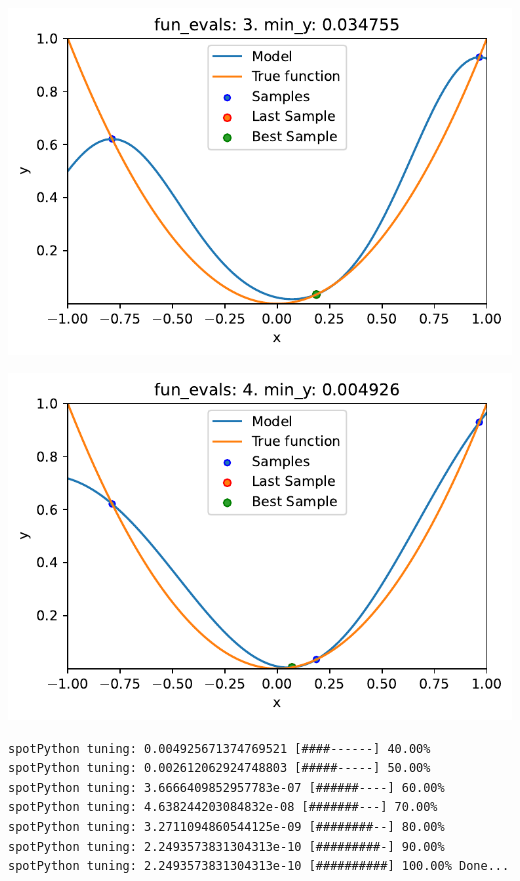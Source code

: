 \documentclass[
  letterpaper,
  DIV=11,
  numbers=noendperiod]{scrreprt}
\begin{document}
\includegraphics{010_num_spot_sklearn_surrogate_files/figure-pdf/cell-24-output-1.pdf}

\includegraphics{010_num_spot_sklearn_surrogate_files/figure-pdf/cell-24-output-2.pdf}

\begin{verbatim}
spotPython tuning: 0.004925671374769521 [####------] 40.00% 
spotPython tuning: 0.002612062924748803 [#####-----] 50.00% 
spotPython tuning: 3.6666409852957783e-07 [######----] 60.00% 
spotPython tuning: 4.638244203084832e-08 [#######---] 70.00% 
spotPython tuning: 3.2711094860544125e-09 [########--] 80.00% 
spotPython tuning: 2.2493573831304313e-10 [#########-] 90.00% 
spotPython tuning: 2.2493573831304313e-10 [##########] 100.00% Done...
\end{verbatim}
\end{document}
